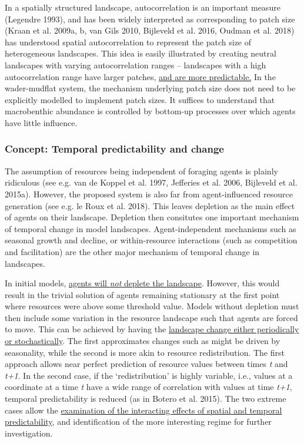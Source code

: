 \documentclass[]{scrartcl}
\begin{document}
\begin{linenumbers}
In a spatially structured landscape, autocorrelation is an important
measure (\protect\hypertarget{__UnoMark__4060_580056431}{}{}Legendre
1993), and has been widely interpreted as corresponding to patch size
(\protect\hypertarget{__UnoMark__4067_580056431}{}{}Kraan et al. 2009a,
b, van Gils 2010, Bijleveld et al. 2016, Oudman et al. 2018) has
understood spatial autocorrelation to represent the patch size of
heterogeneous landscapes. This idea is easily illustrated by creating
neutral landscapes with varying autocorrelation ranges -- landscapes
with a high autocorrelation range have larger patches, \underline{and are
more predictable.} In the wader-mudflat system, the mechanism underlying
patch size does not need to be explicitly modelled to implement patch
sizes. It suffices to understand that macrobenthic abundance is
controlled by bottom-up processes over which agents have little
influence.

\subsubsection{Concept: Temporal predictability and
change}\label{concept-temporal-predictability-and-change}

The assumption of resources being independent of foraging agents is
plainly ridiculous (see e.g.
\protect\hypertarget{__UnoMark__4074_580056431}{}{}van de Koppel et al.
1997, Jefferies et al. 2006, Bijleveld et al. 2015a). However, the
proposed system is also far from agent-influenced resource generation
(see e.g. \protect\hypertarget{__UnoMark__4081_580056431}{}{}le Roux et
al. 2018). This leaves depletion as the main effect of agents on their
landscape. Depletion then consitutes one important mechanism of temporal
change in model landscapes. Agent-independent mechanisms such as
seasonal growth and decline, or within-resource interactions (such as
competition and facilitation) are the other major mechanism of temporal
change in landscapes.

In initial models, \underline{agents will \emph{not} deplete the landscape}.
However, this would result in the trivial solution of agents remaining
stationary at the first point where resources were above some threshold
value. Models without depletion must then include some variation in the
resource landscape such that agents are forced to move. This can be
achieved by having the \underline{landscape change either periodically or
stochastically}. The first approximates changes such as might be driven
by seasonality, while the second is more akin to resource
redistribution. The first approach allows near perfect prediction of
resource values between times \emph{t} and \emph{t+1}. In the second
case, if the `redistribution' is highly variable, i.e., values at a
coordinate at a time \emph{t} have a wide range of correlation with
values at time \emph{t+1}, temporal predictability is reduced (as in
\protect\hypertarget{__UnoMark__4088_580056431}{}{}Botero et al. 2015).
The two extreme cases allow the \underline{examination of the interacting
effects of spatial and temporal predictability}, and identification of
the more interesting regime for further investigation.


\end{linenumbers}
\end{document}
